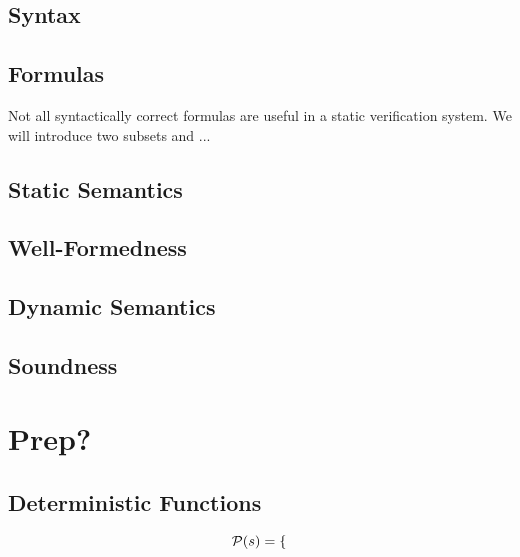 \subsection{Syntax}
\label{sec:syntax}


\subsection{Formulas}
Not all syntactically correct formulas are useful in a static verification system.
We will introduce two subsets \setFormulaA and \setFormulaB ...


\subsection{Static Semantics}%
\label{sec:static-semantics}


\subsection{Well-Formedness}
\label{sec:well-formedness}


\subsection{Dynamic Semantics}
\label{ssec:dynamic-semantics}


\subsection{Soundness}

\section{Prep?}

\subsection{Deterministic Functions}
\begin{displaymath}
\mathcal{P}(s) =
\begin{cases}

\end{cases}
\end{displaymath}

